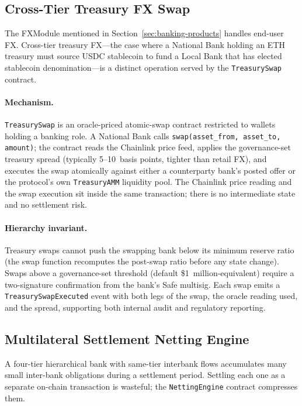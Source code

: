 \documentclass[12pt,a4paper]{report}
\begin{document}
\subsection{Cross-Tier Treasury FX Swap}
\label{sec:treasury-fx}

The FXModule mentioned in Section~\ref{sec:banking-products} handles end-user FX. Cross-tier treasury FX---the case where a National Bank holding an ETH treasury must source USDC stablecoin to fund a Local Bank that has elected stablecoin denomination---is a distinct operation served by the \texttt{TreasurySwap} contract.

\paragraph{Mechanism.}
\texttt{TreasurySwap} is an oracle-priced atomic-swap contract restricted to wallets holding a banking role. A National Bank calls \texttt{swap(asset\_from, asset\_to, amount)}; the contract reads the Chainlink price feed, applies the governance-set treasury spread (typically 5--10~basis points, tighter than retail FX), and executes the swap atomically against either a counterparty bank's posted offer or the protocol's own \texttt{TreasuryAMM} liquidity pool. The Chainlink price reading and the swap execution sit inside the same transaction; there is no intermediate state and no settlement risk.

\paragraph{Hierarchy invariant.}
Treasury swaps cannot push the swapping bank below its minimum reserve ratio (the swap function recomputes the post-swap ratio before any state change). Swaps above a governance-set threshold (default \$1~million-equivalent) require a two-signature confirmation from the bank's Safe multisig. Each swap emits a \texttt{TreasurySwapExecuted} event with both legs of the swap, the oracle reading used, and the spread, supporting both internal audit and regulatory reporting.

\subsection{Multilateral Settlement Netting Engine}
\label{sec:netting-settlement}

A four-tier hierarchical bank with same-tier interbank flows accumulates many small inter-bank obligations during a settlement period. Settling each one as a separate on-chain transaction is wasteful; the \texttt{NettingEngine} contract compresses them.
\end{document}
